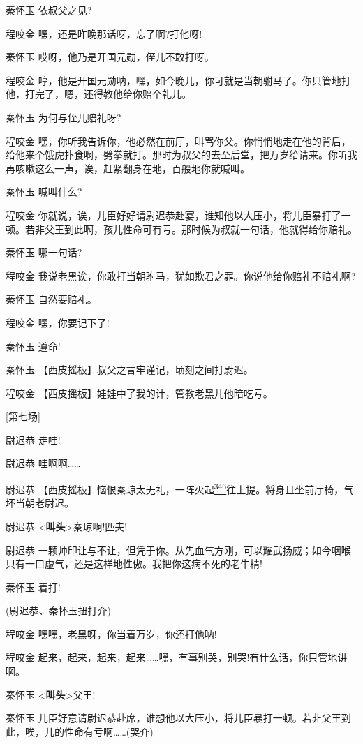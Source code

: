 秦怀玉 依叔父之见?

程咬金 嘿，还是昨晚那话呀，忘了啊?打他呀!

秦怀玉 哎呀，他乃是开国元勋，侄儿不敢打呀。

程咬金
哼，他是开国元勋呐，嘿，如今晚儿，你可就是当朝驸马了。你只管地打他，打完了，嗯，还得教他给你赔个礼儿。

秦怀玉 为何与侄儿赔礼呀?

程咬金
嘿，你听我告诉你，他必然在前厅，叫骂你父。你悄悄地走在他的背后，给他来个饿虎扑食啊，劈拳就打。那时为叔父的去至后堂，把万岁给请来。你听我再咳嗽这么一声，诶，赶紧翻身在地，百般地你就喊叫。

秦怀玉 喊叫什么?

程咬金
你就说，诶，儿臣好好请尉迟恭赴宴，谁知他以大压小，将儿臣暴打了一顿。若非父王到此啊，孩儿性命可有亏。那时候为叔就一句话，他就得给你赔礼。

秦怀玉 哪一句话?

程咬金 我说老黑诶，你敢打当朝驸马，犹如欺君之罪。你说他给你赔礼不赔礼啊?

秦怀玉 自然要赔礼。

程咬金 嘿，你要记下了!

秦怀玉 遵命!

秦怀玉 【西皮摇板】叔父之言牢谨记，顷刻之间打尉迟。

程咬金 【西皮摇板】娃娃中了我的计，管教老黑儿他暗吃亏。

{[}第七场{]}

尉迟恭 走哇!

尉迟恭 哇啊啊\ldots{}\ldots{}

尉迟恭
【西皮摇板】恼恨秦琼太无礼，一阵火起\protect\hyperlink{fn346}{\textsuperscript{346}}往上提。将身且坐前厅椅，气坏当朝老尉迟。

尉迟恭 \textless{}\textbf{叫头}\textgreater{}秦琼啊!匹夫!

尉迟恭
一颗帅印让与不让，但凭于你。从先血气方刚，可以耀武扬威；如今咽喉只有一口虚气，还是这样地性傲。我把你这病不死的老牛精!

秦怀玉 着打!

(尉迟恭、秦怀玉扭打介)

程咬金 嘿嘿，老黑呀，你当着万岁，你还打他呐!

程咬金
起来，起来，起来，起来\ldots{}\ldots{}嘿，有事别哭，别哭!有什么话，你只管地讲啊。

秦怀玉 \textless{}\textbf{叫头}\textgreater{}父王!

秦怀玉
儿臣好意请尉迟恭赴席，谁想他以大压小，将儿臣暴打一顿。若非父王到此，唉，儿的性命有亏啊\ldots{}\ldots{}(哭介)

